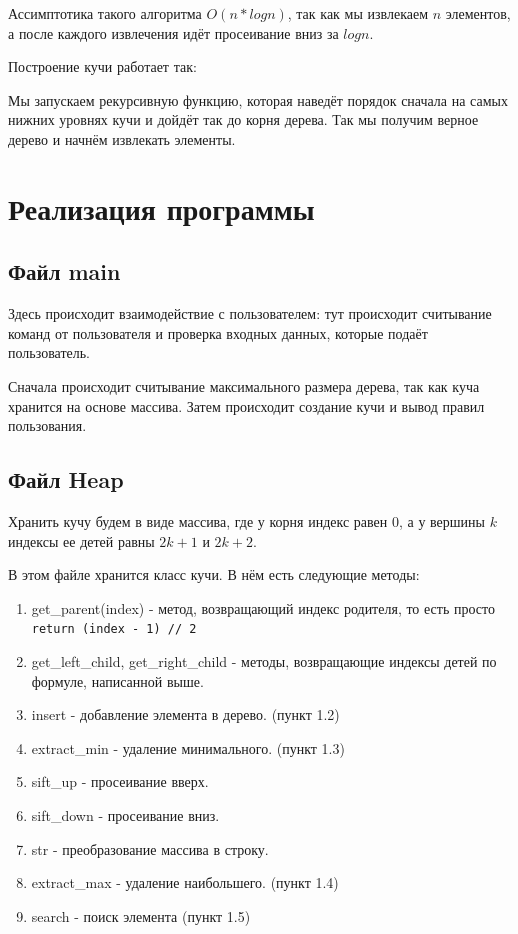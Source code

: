 \documentclass{article}
\begin{document}
Ассимптотика такого алгоритма $O(n*log n)$, так как мы извлекаем $n$ элементов, а после каждого извлечения идёт просеивание вниз за $log n$.

Построение кучи работает так:

Мы запускаем рекурсивную функцию, которая наведёт порядок сначала на самых нижних уровнях кучи и дойдёт так до корня дерева. Так мы получим верное дерево и начнём извлекать элементы.

\newpage

\section{Реализация программы}

\subsection{Файл main}

Здесь происходит взаимодействие с пользователем: тут происходит считывание команд от пользователя и проверка входных данных, которые подаёт пользователь.

Сначала происходит считывание максимального размера дерева, так как куча хранится на основе массива.
Затем происходит создание кучи и вывод правил пользования.

\subsection{Файл Heap}

Хранить кучу будем в виде массива, где у корня индекс равен 0, а у вершины $k$ индексы ее детей равны $2k+1$ и $2k + 2$.

В этом файле хранится класс кучи. В нём есть следующие методы:

\begin{enumerate}
    \item get\_parent(index) - метод, возвращающий индекс родителя, то есть просто \texttt{return (index - 1) // 2}
    \item get\_left\_child, get\_right\_child - методы, возвращающие индексы детей по формуле, написанной выше.
    \item insert - добавление элемента в дерево. (пункт 1.2)
    \item extract\_min - удаление минимального. (пункт 1.3)
    \item sift\_up - просеивание вверх.
    \item sift\_down - просеивание вниз.
    \item str - преобразование массива в строку.
    \item extract\_max - удаление наибольшего. (пункт 1.4)
    \item search - поиск элемента (пункт 1.5)
\end{enumerate}
\end{document}
